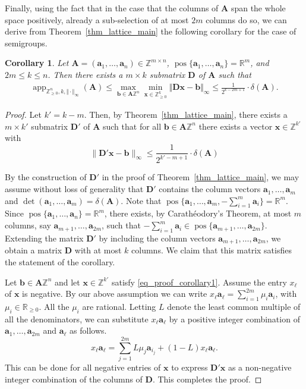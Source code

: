 \documentclass[pdflatex]{sn-jnl}
\DeclareMathOperator{\app}{app}
\DeclareMathOperator{\pos}{pos}
\newcommand{\R}{\mathbb{R}}
\newcommand{\Z}{\mathbb{Z}}
\newcommand{\bA}{\bm{A}}
\newcommand{\bx}{\bm{x}}
\newcommand{\bb}{\bm{b}}
\newcommand{\ba}{\bm{a}}
\newcommand{\bD}{\bm{D}}
\theoremstyle{thmstyleone}%
\newtheorem{corollary}{Corollary}
\theoremstyle{thmstyletwo}%
\theoremstyle{thmstylethree}%
\begin{document}
	Finally, using the fact that in the case that the columns of $\bA$ span the whole space positively, already a sub-selection of at most $2m$ columns do so, 
	we can derive from Theorem~\ref{thm_lattice_main} the following corollary for the case of semigroups.
	\begin{corollary}
		\label{cor_pos_spans_space}
		Let $\bA = (\ba_1,\ldots,\ba_n)\in\Z^{m\times n}$, $\pos\lbrace \ba_1,\ldots,\ba_n\rbrace  = \R^m$, and $2m\leq k\leq n$. Then there exists a $m\times k$ submatrix $\bD$ of $\bA$ such that
		\begin{align*}
			\app_{\Z^n_{\ge0},k,\Vert\cdot\Vert_\infty}(\bA) 
			\leq \max_{\bb\in \bA\Z^n}\min_{\bx\in\Z^k_{\ge0}}\Vert \bD\bx - \bb\Vert_\infty \leq \frac{1}{2^{k - 2m + 1}}\cdot \delta(\bA).
		\end{align*}
	\end{corollary}
	\begin{proof}
		Let $k'=k-m$.
		Then, by Theorem~\ref{thm_lattice_main}, there exists a $m\times k'$ submatrix $\bD'$ of $\bA$ such that for all $\bb \in \bA\Z^n$ there exists a vector $\bx\in\Z^{k'}$ with
		\begin{equation}\label{eq_proof_corollary1}
			\|\bD' \bx - \bb \|_\infty \leq \frac{1}{2^{k' - m + 1}}\cdot \delta(\bA)
		\end{equation}
		
		By the construction of $\bD'$ in the proof of Theorem~\ref{thm_lattice_main}, we may assume without loss of generality  that $\bD'$ contains the column vectors $\ba_1,\ldots,\ba_{m}$ and $\det(\ba_1,\ldots,\ba_m)=\delta(\bA)$.
		Note that $\pos\{\ba_1,\ldots,\ba_m,-\sum_{i=1}^m\ba_i\}=\R^m$.
		Since $\pos\lbrace \ba_1,\ldots,\ba_n\rbrace=\R^m$, there exists, by Carath\'eodory's Theorem, at most $m$ columns, say $\ba_{m+1},\ldots,\ba_{2m}$, such that $-\sum_{i=1}^m\ba_i\in\pos\{\ba_{m+1},\ldots,\ba_{2m}\}$.
		Extending the matrix $\bD'$ by including the column vectors $\ba_{m+1},\ldots,\ba_{2m}$, we obtain a matrix $\bD$ with at most $k$ columns.
		We claim that this matrix satisfies the statement of the corollary.
		
		Let $\bb \in \bA\Z^n$ and let $\bx\in\Z^{k'}$ satisfy \eqref{eq_proof_corollary1}.
		Assume the entry $x_\ell$ of $\bx$ is negative.
		By our above assumption we can write $x_\ell\ba_\ell=\sum_{i=1}^{2m} \mu_i\ba_{i}$, with $\mu_i\in\R_{\geq 0}$.
		All the $\mu_i$ are rational.
		Letting $L$ denote the least common multiple of all the denominators, we can substitute $x_\ell\ba_\ell$ by a positive integer combination of $\ba_{1},\ldots,\ba_{2m}$ and $\ba_\ell$ as follows.
		\[
		x_\ell\ba_\ell = \sum_{j=1}^{2m} L\mu_j\ba_{i_j} + (1-L) x_\ell\ba_\ell.
		\]
		This can be done for all negative entries of $\bx$ to express $\bD' \bx$ as a non-negative integer combination of the columns of $\bD$.
		This completes the proof.
	\end{proof}
	
\end{document}
